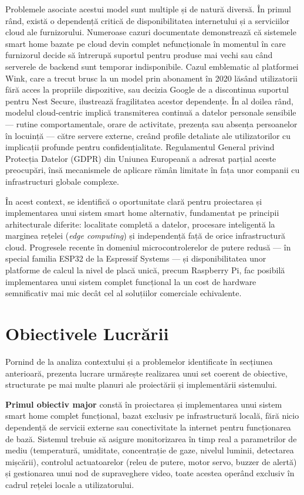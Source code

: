 \documentclass[12pt, twoside, a4paper]{report}
\begin{document}
Problemele asociate acestui model sunt multiple și de natură diversă. În primul rând,
există o dependență critică de disponibilitatea internetului și a serviciilor cloud ale
furnizorului. Numeroase cazuri documentate demonstrează că sistemele smart home bazate
pe cloud devin complet nefuncționale în momentul în care furnizorul decide să întrerupă
suportul pentru produse mai vechi sau când serverele de backend sunt temporar indisponibile.
Cazul emblematic al platformei Wink, care a trecut brusc la un model prin abonament în
2020 lăsând utilizatorii fără acces la propriile dispozitive, sau decizia Google de a
discontinua suportul pentru Nest Secure, ilustrează fragilitatea acestor dependențe.
În al doilea rând, modelul cloud-centric implică transmiterea continuă a datelor personale
sensibile --- rutine comportamentale, orare de activitate, prezența sau absența persoanelor
în locuință --- către servere externe, creând profile detaliate ale utilizatorilor cu
implicații profunde pentru confidențialitate. Regulamentul General privind Protecția
Datelor (GDPR) din Uniunea Europeană a adresat parțial aceste preocupări, însă mecanismele
de aplicare rămân limitate în fața unor companii cu infrastructuri globale complexe.

În acest context, se identifică o oportunitate clară pentru proiectarea și implementarea
unui sistem smart home alternativ, fundamentat pe principii arhitecturale diferite:
localitate completă a datelor, procesare inteligentă la marginea rețelei
(\textit{edge computing}) și independență față de orice infrastructură cloud. Progresele
recente în domeniul microcontrolerelor de putere redusă --- în special familia ESP32 de
la Espressif Systems --- și disponibilitatea unor platforme de calcul la nivel de placă
unică, precum Raspberry Pi, fac posibilă implementarea unui sistem complet funcțional
la un cost de hardware semnificativ mai mic decât cel al soluțiilor comerciale echivalente.

\section{Obiectivele Lucrării}

Pornind de la analiza contextului și a problemelor identificate în secțiunea
anterioară, prezenta lucrare urmărește realizarea unui set coerent de obiective,
structurate pe mai multe planuri ale proiectării și implementării sistemului.

\textbf{Primul obiectiv major} constă în proiectarea și implementarea unui sistem
smart home complet funcțional, bazat exclusiv pe infrastructură locală, fără nicio
dependență de servicii externe sau conectivitate la internet pentru funcționarea de bază.
Sistemul trebuie să asigure monitorizarea în timp real a parametrilor de mediu
(temperatură, umiditate, concentrație de gaze, nivelul luminii, detectarea mișcării),
controlul actuatoarelor (releu de putere, motor servo, buzzer de alertă) și gestionarea
unui nod de supraveghere video, toate acestea operând exclusiv în cadrul rețelei locale
a utilizatorului.
\end{document}

